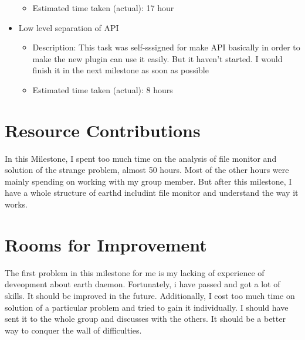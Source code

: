 \begin{itemize}
\begin{itemize}
	         \item Estimated time taken (actual): 17 hour
	     \end{itemize}
	\item Low level separation of API
	     \begin{itemize}
	         \item Description: This task was self-sssigned for make API basically in order to make the new plugin can use it easily. But it haven't started. I would finish it in the next milestone as soon as possible
	         \item Estimated time taken (actual): 8 hours
	     \end{itemize}
\end{itemize}

\section*{Resource Contributions}

In this Milestone, I spent too much time on the analysis of file monitor and solution of the strange problem, almost 50 hours. Most of the other hours were mainly spending on working with my group member. But after this milestone, I have a whole structure of earthd includint file monitor and understand the way it works.

\section*{Rooms for Improvement}


The first problem in this milestone for me is my lacking of experience of deveopment about earth daemon. Fortunately, i have passed and got a lot of skills. It should be improved in the future. Additionally, I cost too much time on solution of a particular problem and tried to gain it individually. I should have sent it to the whole group and discusses with the others. It should be a better way to conquer the wall of difficulties.
